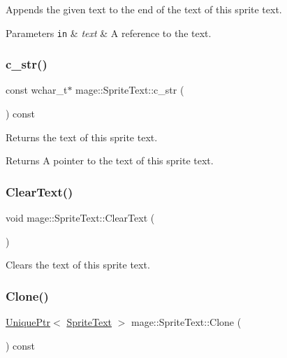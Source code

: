Appends the given text to the end of the text of this sprite text.


\begin{DoxyParams}[1]{Parameters}
\mbox{\tt in}  & {\em text} & A reference to the text. \\
\hline
\end{DoxyParams}
\hypertarget{classmage_1_1_sprite_text_ada15a0d1986cf1f2c2ac7302be20d6a7}{}\label{classmage_1_1_sprite_text_ada15a0d1986cf1f2c2ac7302be20d6a7} 
\subsubsection{\texorpdfstring{c\+\_\+str()}{c\_str()}}
{\footnotesize\ttfamily const wchar\+\_\+t$\ast$ mage\+::\+Sprite\+Text\+::c\+\_\+str (\begin{DoxyParamCaption}{ }\end{DoxyParamCaption}) const}

Returns the text of this sprite text.

\begin{DoxyReturn}{Returns}
A pointer to the text of this sprite text. 
\end{DoxyReturn}
\hypertarget{classmage_1_1_sprite_text_a73c5a10e846e94f2f79a25a78bf2e6d0}{}\label{classmage_1_1_sprite_text_a73c5a10e846e94f2f79a25a78bf2e6d0} 
\subsubsection{\texorpdfstring{Clear\+Text()}{ClearText()}}
{\footnotesize\ttfamily void mage\+::\+Sprite\+Text\+::\+Clear\+Text (\begin{DoxyParamCaption}{ }\end{DoxyParamCaption})}

Clears the text of this sprite text. \hypertarget{classmage_1_1_sprite_text_ad76e6d91e59f5070152104da8af1aa4e}{}\label{classmage_1_1_sprite_text_ad76e6d91e59f5070152104da8af1aa4e} 
\subsubsection{\texorpdfstring{Clone()}{Clone()}}
{\footnotesize\ttfamily \hyperlink{namespacemage_a8c307fbcc33bce9b7f2aa4c26c3b95cf}{Unique\+Ptr}$<$ \hyperlink{classmage_1_1_sprite_text}{Sprite\+Text} $>$ mage\+::\+Sprite\+Text\+::\+Clone (\begin{DoxyParamCaption}{ }\end{DoxyParamCaption}) const}

